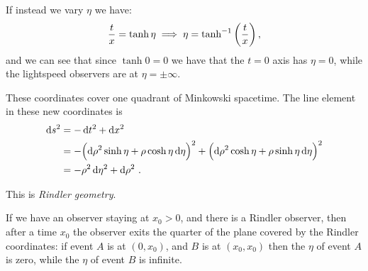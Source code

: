 \documentclass[main.tex]{subfiles}
\begin{document}
If instead we vary \(\eta \) we have: 
%
\begin{align}
  \frac{t}{x} = \tanh \eta \implies 
  \eta = \tanh^{-1} \qty(\frac{t}{x})
\,,
\end{align}
%
and we can see that since \(\tanh 0 = 0 \) we have that the \(t=0\) axis has \(\eta = 0\), while the lightspeed observers are at \(\eta = \pm \infty\). 

These coordinates cover one quadrant of Minkowski spacetime. 
The line element in these new coordinates is 
%
\begin{align}
  \dd{s^2} &= - \dd{t^2} + \dd{x^2}   \\
  &= - \qty(\dd{\rho^2} \sinh \eta  + \rho \cosh \eta \dd{\eta })^2
  + \qty( \dd{\rho^2} \cosh \eta + \rho \sinh \eta \dd{\eta })^2  \\
  &= - \rho^2 \dd{\eta^2} + \dd{\rho^2}
\,.
\end{align}
%

This is \emph{Rindler geometry}. 

If we have an observer staying at \(x_0 >0\), and there is a Rindler observer, then after a time \(x_0\) the observer exits the quarter of the plane covered by the Rindler coordinates: if event \(A\) is at \((0, x_0 )\), and \(B\) is at \((x_0 , x_0 )\) then the \(\eta \) of event \(A\) is zero, while the \(\eta \) of event \(B\) is infinite. 
\end{document}
